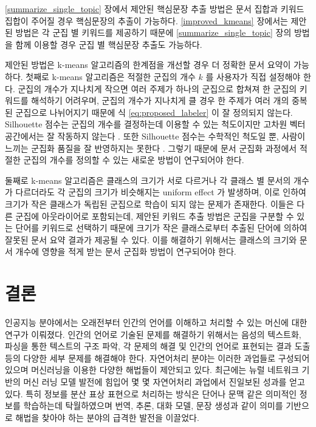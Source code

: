 \documentclass[oneside, ko,phd]{snuthesis_utf8_kor}
\begin{document}
\ref{summarize_single_topic} 장에서 제안된 핵심문장 추출 방법은 문서 집합과 키워드 집합이 주어질 경우 핵심문장의 추출이 가능하다.
\ref{improved_kmeans} 장에서는 제안된 방법은 각 군집 별 키워드를 제공하기 때문에 \ref{summarize_single_topic} 장의 방법을 함께 이용할 경우 군집 별 핵심문장 추출도 가능하다.

제안된 방법은 k-means 알고리즘의 한계점을 개선할 경우 더 정확한 문서 요약이 가능하다.
첫째로 k-means 알고리즘은 적절한 군집의 개수 $k$ 를 사용자가 직접 설정해야 한다.
군집의 개수가 지나치게 작으면 여러 주제가 하나의 군집으로 합쳐져 한 군집의 키워드를 해석하기 어려우며, 군집의 개수가 지나치게 클 경우 한 주제가 여러 개의 중복된 군집으로 나뉘어지기 때문에 식 \ref{eq:proposed_labeler} 이 잘 정의되지 않는다.
Silhouette 점수는 군집의 개수를 결정하는데 이용할 수 있는 척도이지만 고차원 벡터 공간에서는 잘 작동하지 않는다 \cite{almeida2011there}.
또한 Silhouette 점수는 수학적인 척도일 뿐, 사람이 느끼는 군집화 품질을 잘 반영하지는 못한다 \cite{newman2010evaluating}.
그렇기 때문에 문서 군집화 과정에서 적절한 군집의 개수를 정의할 수 있는 새로운 방법이 연구되어야 한다.

둘째로 k-means 알고리즘은 클래스의 크기가 서로 다르거나 각 클래스 별 문서의 개수가 다르더라도 각 군집의 크기가 비슷해지는 uniform effect \cite{xiong2008k} 가 발생하며, 이로 인하여 크기가 작은 클래스가 독립된 군집으로 학습이 되지 않는 문제가 존재한다.
이들은 다른 군집에 아웃라이어로 포함되는데, 제안된 키워드 추출 방법은 군집을 구분할 수 있는 단어를 키워드로 선택하기 때문에 크기가 작은 클래스로부터 추출된 단어에 의하여 잘못된 문서 요약 결과가 제공될 수 있다.
이를 해결하기 위해서는 클래스의 크기와 문서 개수에 영향을 적게 받는 문서 군집화 방법이 연구되어야 한다.

\newpage
\chapter{결론} \label{conclusion}

인공지능 분야에서는 오래전부터 인간의 언어를 이해하고 처리할 수 있는 머신에 대한 연구가 이뤄졌다.
인간의 언어로 기술된 문제를 해결하기 위해서는 음성의 텍스트화, 파싱을 통한 텍스트의 구조 파악, 각 문제의 해결 및 인간의 언어로 표현되는 결과 도출 등의 다양한 세부 문제를 해결해야 한다.
자연어처리 분야는 이러한 과업들로 구성되어 있으며 머신러닝을 이용한 다양한 해법들이 제안되고 있다.
최근에는 뉴럴 네트워크 기반의 머신 러닝 모델 발전에 힘입어 몇 몇 자연어처리 과업에서 진일보된 성과를 얻고 있다.
특히 정보를 분산 표상 표현으로 처리하는 방식은 단어나 문맥 같은 의미적인 정보를 학습하는데 탁월하였으며 번역, 추론, 대화 모델, 문장 생성과 같이 의미를 기반으로 해법을 찾아야 하는 분야의 급격한 발전을 이끌었다.
\end{document}
